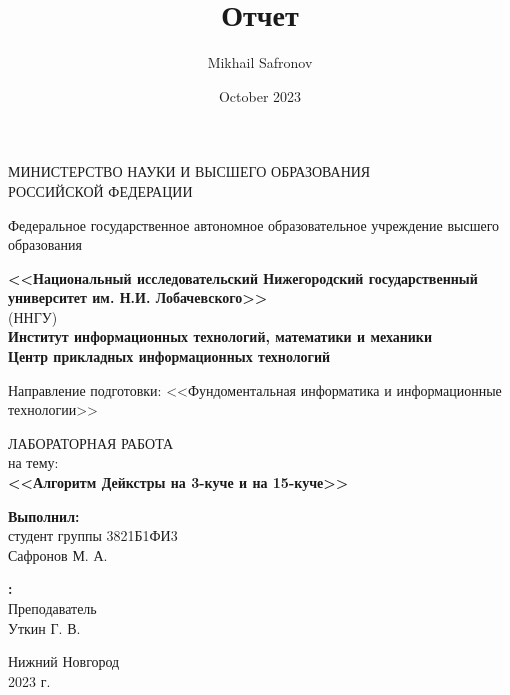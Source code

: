 \documentclass[a4paper, 12pt]{article}
\title{Отчет}
\author{Mikhail Safronov}
\date{October 2023}
\theoremstyle{definition}
\begin{document}
	
	
	\begin{titlepage}
		\begin{center}
			\large
			{МИНИСТЕРСТВО НАУКИ И ВЫСШЕГО ОБРАЗОВАНИЯ\\ РОССИЙСКОЙ ФЕДЕРАЦИИ}
			
			Федеральное государственное автономное образовательное учреждение высшего образования
			\vspace{0.5cm}
			
			\textbf{<<Национальный исследовательский Нижегородский государственный университет им. Н.И. Лобачевского>>}\\
			(ННГУ)\\
			\vspace{1cm}
			\textbf{Институт информационных технологий, математики и механики}\\
			\vspace{1cm}
			\textbf{Центр прикладных информационных технологий}
			\vspace{1cm}
			
			Направление подготовки: <<Фундоментальная информатика и информационные технологии>>\\
			\vfill
			
			
			
			\vfill
			
			\Large
			ЛАБОРАТОРНАЯ РАБОТА\\
			на тему:\\
			\textbf{<<Алгоритм Дейкстры на 3-куче и на 15-куче>>}
			{\LARGE 
			}
			\bigskip
			
			
		\end{center}
		\vfill
		
		\newlength{\ML}
		\hfill\begin{minipage}{0.4\textwidth}
			\textbf{Выполнил:}\\
			студент группы 3821Б1ФИ3\\
			Сафронов М. А.\\
		\end{minipage}%
		\bigskip
		
		\hfill\begin{minipage}{0.4\textwidth}
			\textbf{:}\\
			Преподаватель\\
			Уткин Г. В.\\
		\end{minipage}%
		\vfill
		
		\begin{center}
			Нижний Новгород\\
			2023 г.
		\end{center}
	\end{titlepage}
	
\end{document}
